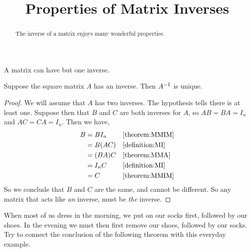 \documentclass{ximera}
\title{Properties of Matrix Inverses}
\begin{document}
\begin{abstract}
  The inverse of a matrix enjoys many wonderful properties.
\end{abstract}
\maketitle

A matrix can have but one inverse.

\begin{theorem}
  \label{theorem:MIU}
  
  Suppose the square matrix $A$ has an inverse.  Then $A^{-1}$ is
  unique.

  \begin{proof}
    We will assume that $A$ has two inverses.  The hypothesis tells
    there is at least one.  Suppose then that $B$ and $C$ are both
    inverses for $A$, so $AB=BA=I_n$ and $AC=CA=I_n$.  Then we have,
    \begin{align*}
      B
      &=BI_n&&\ref{theorem:MMIM}\\
      &=B(AC)&&\ref{definition:MI}\\
      &=(BA)C&&\ref{theorem:MMA}\\
      &=I_nC&&\ref{definition:MI}\\
      &=C&&\ref{theorem:MMIM}
    \end{align*}
    So we conclude that $B$ and $C$ are the same, and cannot be different.  So any matrix that acts like \textit{an} inverse, must be \textit{the} inverse.
  \end{proof}
\end{theorem}

When most of us dress in the morning, we put on our socks first,
followed by our shoes.  In the evening we must then first remove our
shoes, followed by our socks.  Try to connect the conclusion of the
following theorem with this everyday example.
\end{document}
